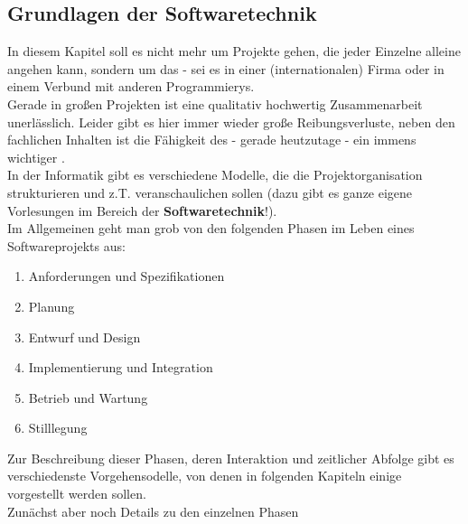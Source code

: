 \documentclass{article}
\begin{document}
\subsection{Grundlagen der Softwaretechnik}
In diesem Kapitel soll es nicht mehr um Projekte gehen, die jeder Einzelne alleine angehen kann, sondern um das  - sei es in einer (internationalen) Firma oder  in einem Verbund mit anderen Programmierys. \\
Gerade in großen Projekten ist eine qualitativ hochwertig Zusammenarbeit unerlässlich. Leider gibt es hier immer wieder große Reibungsverluste, neben den fachlichen Inhalten ist die Fähigkeit des  - gerade heutzutage - ein immens wichtiger . \\
In der Informatik gibt es verschiedene Modelle, die die Projektorganisation strukturieren und z.T. veranschaulichen sollen (dazu gibt es ganze eigene Vorlesungen im Bereich der \textbf{Softwaretechnik}!). \\
Im Allgemeinen geht man grob von den folgenden Phasen im Leben eines Softwareprojekts aus:
\begin{enumerate}
    \item Anforderungen und Spezifikationen
    \item Planung
    \item Entwurf und Design
    \item Implementierung und Integration
    \item Betrieb und Wartung
    \item Stilllegung
\end{enumerate}
Zur Beschreibung dieser Phasen, deren Interaktion und zeitlicher Abfolge gibt es verschiedenste Vorgehensodelle, von denen in folgenden Kapiteln einige vorgestellt werden sollen. \\
Zunächst aber noch Details zu den einzelnen Phasen \\
\end{document}
